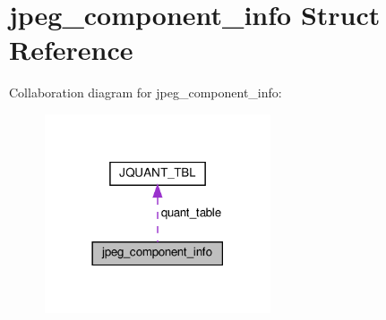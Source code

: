 \hypertarget{structjpeg__component__info}{}\section{jpeg\+\_\+component\+\_\+info Struct Reference}
\label{structjpeg__component__info}


Collaboration diagram for jpeg\+\_\+component\+\_\+info\+:
\nopagebreak
\begin{figure}[H]
\begin{center}
\leavevmode
\includegraphics[width=189pt]{structjpeg__component__info__coll__graph}
\end{center}
\end{figure}
